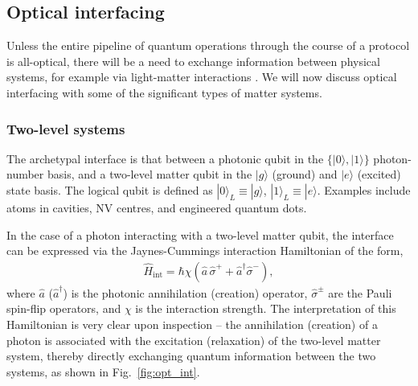 \documentclass[aps,rmp,twocolumn,amsmath,amssymb,nofootinbib,superscriptaddress,longbibliography,floatfix,table-of-contents,eqsecnum]{revtex4-1}
\newcommand{\ket}[1]{|#1\rangle}
\newcommand{\comment}[1]{{\color{blue}{\textbf{#1}}}}
\begin{document}
\comment{To do!}

%
%

\subsection{Optical interfacing} \label{sec:opt_inter} 

Unless the entire pipeline of quantum operations through the course of a protocol is all-optical, there will be a need to exchange information between physical systems, for example via light-matter interactions \cite{bib:Cohen-Tannoudji92}. We will now discuss optical interfacing with some of the significant types of matter systems.

%
%

\subsubsection{Two-level systems} 

The archetypal interface is that between a photonic qubit in the \mbox{$\{\ket{0},\ket{1}\}$} photon-number basis, and a two-level matter qubit in the $\ket{g}$ (ground) and $\ket{e}$ (excited) state basis. The logical qubit is defined as \mbox{$\ket{0}_L\equiv\ket{g}$}, \mbox{$\ket{1}_L\equiv\ket{e}$}. Examples include atoms in cavities, NV centres, and engineered quantum dots.

In the case of a photon interacting with a two-level matter qubit, the interface can be expressed via the Jaynes-Cummings interaction Hamiltonian of the form,
\begin{align} \label{eq:two_level_hamil}
\hat{H}_\text{int} = \hbar \chi (\hat{a}\,\hat\sigma^+ + \hat{a}^\dag\hat\sigma^-),
\end{align}
where $\hat{a}$ ($\hat{a}^\dag$) is the photonic annihilation (creation) operator, $\hat\sigma^\pm$ are the Pauli spin-flip operators, and $\chi$ is the interaction strength. The interpretation of this Hamiltonian is very clear upon inspection -- the annihilation (creation) of a photon is associated with the excitation (relaxation) of the two-level matter system, thereby directly exchanging quantum information between the two systems, as shown in Fig.~\ref{fig:opt_int}.
\end{document}
